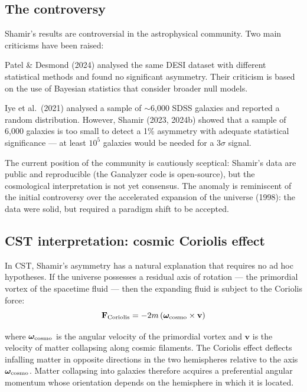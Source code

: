\documentclass[10pt,a4paper]{article}
\begin{document}
\subsection{The controversy}

Shamir's results are controversial in the astrophysical community. Two main criticisms have been raised:

Patel \& Desmond (2024) \cite{PatelDesmond2024} analysed the same DESI dataset with different statistical methods and found no significant asymmetry. Their criticism is based on the use of Bayesian statistics that consider broader null models.

Iye et al.\ (2021) \cite{Iye2021} analysed a sample of $\sim$6,000 SDSS galaxies and reported a random distribution. However, Shamir (2023, 2024b) \cite{Shamir2023,Shamir2024b} showed that a sample of 6,000 galaxies is too small to detect a 1\% asymmetry with adequate statistical significance --- at least $10^5$ galaxies would be needed for a 3$\sigma$ signal.

The current position of the community is cautiously sceptical: Shamir's data are public and reproducible (the Ganalyzer code is open-source), but the cosmological interpretation is not yet consensus. The anomaly is reminiscent of the initial controversy over the accelerated expansion of the universe (1998): the data were solid, but required a paradigm shift to be accepted.

\subsection{CST interpretation: cosmic Coriolis effect}

In CST, Shamir's asymmetry has a natural explanation that requires no ad hoc hypotheses. If the universe possesses a residual axis of rotation --- the primordial vortex of the spacetime fluid --- then the expanding fluid is subject to the Coriolis force:
\begin{equation}
\mathbf{F}_{\rm Coriolis} = -2m\,(\boldsymbol{\omega}_{\rm cosmo} \times \mathbf{v})
\end{equation}

where $\boldsymbol{\omega}_{\rm cosmo}$ is the angular velocity of the primordial vortex and $\mathbf{v}$ is the velocity of matter collapsing along cosmic filaments. The Coriolis effect deflects infalling matter in opposite directions in the two hemispheres relative to the axis $\boldsymbol{\omega}_{\rm cosmo}$. Matter collapsing into galaxies therefore acquires a preferential angular momentum whose orientation depends on the hemisphere in which it is located.
\end{document}
